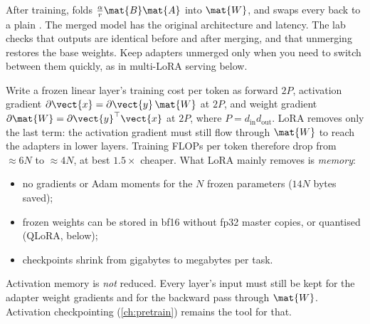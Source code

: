 \begin{keyidea}
After training,  folds $\frac{\alpha}{r}\mat{B}\mat{A}$ into $\mat{W}$,
and  swaps every  back to a plain .
The merged model has the original architecture and latency. The lab checks that
outputs are identical before and after merging, and that unmerging restores the base
weights. Keep adapters unmerged only when you need to switch between them quickly, as
in multi-LoRA serving below.
\end{keyidea}

\begin{systemslens}
Write a frozen linear layer's training cost per token as forward $2P$, activation
gradient $\partial\vect{x}=\partial\vect{y}\,\mat{W}$ at $2P$, and weight gradient
$\partial\mat{W}=\partial\vect{y}^\top\vect{x}$ at $2P$, where $P=d_\text{in}d_\text{out}$.
LoRA removes only the last term: the activation gradient must still flow through
$\mat{W}$ to reach the adapters in lower layers. Training FLOPs per token therefore
drop from $\approx6N$ to $\approx4N$, at best $1.5\times$ cheaper. What LoRA mainly
removes is \emph{memory}:
\begin{itemize}
\item no gradients or Adam moments for the $N$ frozen parameters ($14N$ bytes saved);
\item frozen weights can be stored in bf16 without fp32 master copies, or quantised
(QLoRA, below);
\item checkpoints shrink from gigabytes to megabytes per task.
\end{itemize}
Activation memory is \emph{not} reduced. Every layer's input must still be kept for the
adapter weight gradients and for the backward pass through $\mat{W}$. Activation
checkpointing (\cref{ch:pretrain}) remains the tool for that.
\end{systemslens}

